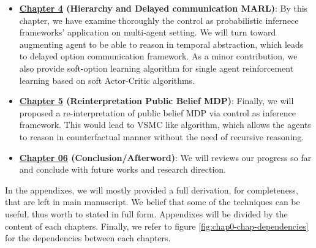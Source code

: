 \begin{itemize}
    \item \textbf{\hyperref[chapter:chap4]{Chapter 4} (Hierarchy and Delayed communication MARL)}: By this chapter, we have examine thoroughly the control as probabilistic infernece frameworks' application on multi-agent setting. We will turn toward augmenting agent to be able to reason in temporal abstraction, which leads to delayed option communication framework. As a minor contribution, we also provide soft-option learning algorithm for single agent reinforcement learning based on soft Actor-Critic algorithms.
    \item \textbf{\hyperref[chapter:chap5]{Chapter 5} (Reinterpretation Public Belief MDP)}: Finally, we will proposed a re-interpretation of public belief MDP via control as inference framework. This would lead to VSMC like algorithm, which allows the agents to reason in counterfactual manner without the need of recursive reasoning.
    \item \textbf{\hyperref[chapter:chap6]{Chapter 06} (Conclusion/Afterword)}: We will reviews our progress so far and conclude with future works and  research direction. 
\end{itemize}
In the appendixes, we will mostly provided a full derivation, for completeness, that are left in main manuscript. We belief that some of the techniques can be useful, thus worth to stated in full form. Appendixes will be divided by the content of each chapters. Finally, we refer to figure \ref{fig:chap0-chap-dependencies} for the dependencies between each chapters.